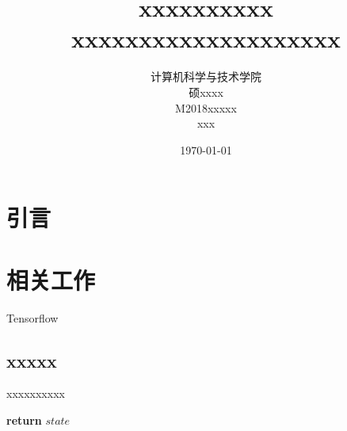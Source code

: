 \documentclass[UTF8,cs4size]{ctexart}
\title{xxxxxxxxxx\\ \bigskip \textbf{xxxxxxxxxxxxxxxxxxxx}}
\author{计算机科学与技术学院\\ 硕xxxx\\ M2018xxxxx\\ xxx}
\date{\today}
\begin{document}
\maketitle
\newpage
\null\thispagestyle{empty}
\newpage


\tableofcontents
\newpage
\null\thispagestyle{empty}
\newpage


\section{引言}
\newpage

\section{相关工作}
Tensorflow~\cite{DBLP:conf/osdi/AbadiBCCDDDGIIK16}


\subsection{xxxxx}
\begin{algorithm}
	\algrenewcommand{}
	\algrenewcommand{}
	\caption{xxxxxxxxxx}
	\label{alg:main}
  \begin{algorithmic}[1]
    \State \textbf{return} $state$
	\end{algorithmic}  
\end{algorithm}
\end{document}
